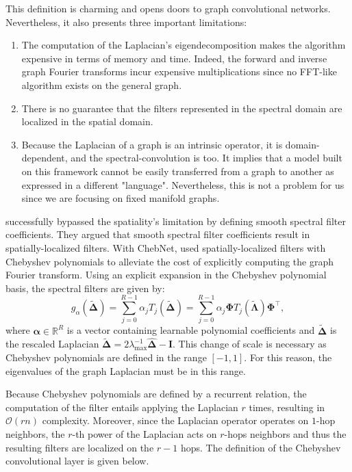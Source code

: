 \documentclass{article}
\begin{document}
This definition is charming and opens doors to graph convolutional networks. Nevertheless, it also presents three important limitations:
\begin{enumerate}
    \item The computation of the Laplacian's eigendecomposition makes the algorithm expensive in terms of memory and time. Indeed, the forward and inverse graph Fourier transforms incur expensive multiplications since no FFT-like algorithm exists on the general graph.
    \item There is no guarantee that the filters represented in the spectral domain are localized in the spatial domain.
    \item Because the Laplacian of a graph is an intrinsic operator, it is domain-dependent, and the spectral-convolution is too. It implies that a model built on this framework cannot be easily transferred from a graph to another as expressed in a different "language". Nevertheless, this is not a problem for us since we are focusing on fixed manifold graphs.
\end{enumerate}

\citet{henaff2015deep} successfully bypassed the spatiality's limitation by defining smooth spectral filter coefficients. They argued that smooth spectral filter coefficients result in spatially-localized filters. With ChebNet, \citet{defferrard2016chebnet} used spatially-localized filters with Chebyshev polynomials to alleviate the cost of explicitly computing the graph Fourier transform. Using an explicit expansion in the Chebyshev polynomial basis, the spectral filters are given by:
\begin{equation} \label{eq:Chebyshev_filters}
g_{\alpha}(\boldsymbol{\tilde{\Delta}}) = \sum_{j=0}^{R-1} \alpha_j T_j (\boldsymbol{\tilde{\Delta}}) = \sum_{j=0}^{R-1} \alpha_j \boldsymbol{\Phi} T_j (\boldsymbol{\tilde{\Lambda}}) \boldsymbol{\Phi}^\top,
\end{equation}
where $\boldsymbol{\alpha} \in \mathbb{R}^R$ is a vector containing learnable polynomial coefficients and $\boldsymbol{\tilde{\Delta}}$ is the rescaled Laplacian $\boldsymbol{\tilde{\Delta}} = 2\lambda_{\max}^{-1}\boldsymbol{\hat{\Delta}} - \boldsymbol{I}$. This change of scale is necessary as Chebyshev polynomials are defined in the range $[-1,1]$. For this reason, the eigenvalues of the graph Laplacian must be in this range.

Because Chebyshev polynomials are defined by a recurrent relation, the computation of the filter entails applying the Laplacian $r$ times, resulting in $\mathcal{O}(rn)$ complexity. Moreover, since the Laplacian operator operates on $1$-hop neighbors, the $r$-th power of the Laplacian acts on $r$-hops neighbors and thus the resulting filters are localized on the $r-1$ hops. The definition of the Chebyshev convolutional layer is given below.
\end{document}

